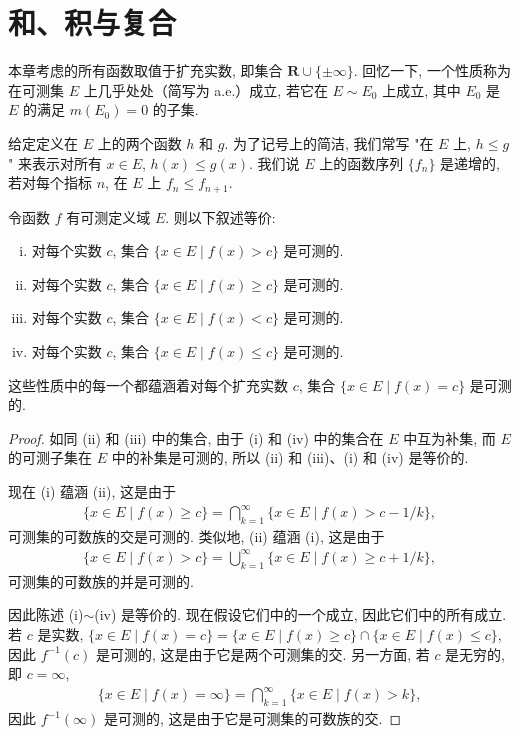 \documentclass[../../main.tex]{subfiles}
\begin{document}
\section{和、积与复合}\label{section:ch03-和积复合}

本章考虑的所有函数取值于扩充实数, 即集合 $\mathbf{R}\cup\{\pm\infty\}$. 回忆一下, 一个性质称为在可测集 $E$ 上几乎处处（简写为 a.e.）成立, 若它在 $E\sim E_{0}$ 上成立, 其中 $E_{0}$ 是 $E$ 的满足 $m(E_{0})=0$ 的子集.

给定定义在 $E$ 上的两个函数 $h$ 和 $g$. 为了记号上的简洁, 我们常写 "在 $E$ 上, $h\leqslant g$" 来表示对所有 $x\in E$, $h(x)\leqslant g(x)$. 我们说 $E$ 上的函数序列 $\{f_{n}\}$ 是递增的, 若对每个指标 $n$, 在 $E$ 上 $f_{n}\leqslant f_{n+1}$.

\begin{proposition}\label{proposition:ch03-可测等价}
令函数 $f$ 有可测定义域 $E$. 则以下叙述等价:
\begin{enumerate}[(i)]
\item 对每个实数 $c$, 集合 $\{x\in E\mid f(x)>c\}$ 是可测的.
\item 对每个实数 $c$, 集合 $\{x\in E\mid f(x)\geqslant c\}$ 是可测的.
\item 对每个实数 $c$, 集合 $\{x\in E\mid f(x)<c\}$ 是可测的.
\item 对每个实数 $c$, 集合 $\{x\in E\mid f(x)\leqslant c\}$ 是可测的.
\end{enumerate}
这些性质中的每一个都蕴涵着对每个扩充实数 $c$, 集合 $\{x\in E\mid f(x)=c\}$ 是可测的.
\end{proposition}

\begin{proof}
如同 (ii) 和 (iii) 中的集合, 由于 (i) 和 (iv) 中的集合在 $E$ 中互为补集, 而 $E$ 的可测子集在 $E$ 中的补集是可测的, 所以 (ii) 和 (iii)、(i) 和 (iv) 是等价的.

现在 (i) 蕴涵 (ii), 这是由于
\begin{align*}
\{x\in E\mid f(x)\geqslant c\}=\bigcap_{k=1}^{\infty}\{x\in E\mid f(x)>c-1/k\},
\end{align*}
可测集的可数族的交是可测的. 类似地, (ii) 蕴涵 (i), 这是由于
\begin{align*}
\{x\in E\mid f(x)>c\}=\bigcup_{k=1}^{\infty}\{x\in E\mid f(x)\geqslant c+1/k\},
\end{align*}
可测集的可数族的并是可测的.

因此陈述 (i)$\sim$(iv) 是等价的. 现在假设它们中的一个成立, 因此它们中的所有成立. 若 $c$ 是实数, $\{x\in E\mid f(x)=c\}=\{x\in E\mid f(x)\geqslant c\}\cap\{x\in E\mid f(x)\leqslant c\}$, 因此 $f^{-1}(c)$ 是可测的, 这是由于它是两个可测集的交. 另一方面, 若 $c$ 是无穷的, 即 $c=\infty$,
\begin{align*}
\{x\in E\mid f(x)=\infty\}=\bigcap_{k=1}^{\infty}\{x\in E\mid f(x)>k\},
\end{align*}
因此 $f^{-1}(\infty)$ 是可测的, 这是由于它是可测集的可数族的交.
\end{proof}
\end{document}
